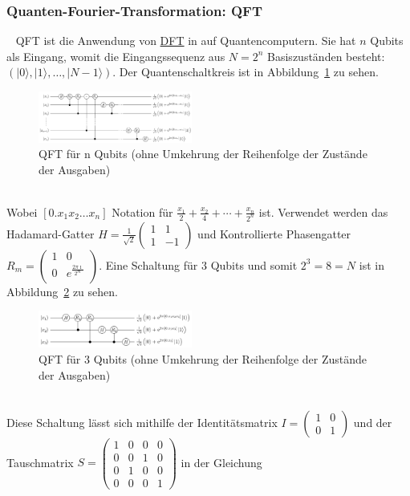 \subsubsection{\textbf{Quanten-Fourier-Transformation: QFT}}\label{sec:QFT}~\newline
QFT ist die Anwendung von \hyperref[sec:DFT]{DFT} in auf Quantencomputern. Sie hat \(n\) Qubits als Eingang, womit die Eingangssequenz aus \(N = 2^n\) Basiszuständen besteht: \(\left(|0\rangle,|1\rangle,\dots,|N-1\rangle\right)\). Der Quantenschaltkreis ist in Abbildung~\ref{fig:QFT_n_Qubits} zu sehen.
\begin{figure}[hb]
	\centering
	\includegraphics[width=0.45\textwidth]{sections/felix/Q_fourier_nqubits.png}
	\caption{QFT für n Qubits (ohne Umkehrung der Reihenfolge der Zustände der Ausgaben) \cite{noauthor_q_fourier_nqubitspng_2018}}
	\label{fig:QFT_n_Qubits}
\end{figure}
\\Wobei \(\left[0.x_1 x_2 \dots x_n\right]\) Notation für \(\frac{x_1}{2}+\frac{x_2}{4}+\cdots+\frac{x_n}{2^n}\) ist.
Verwendet werden das Hadamard-Gatter \(H = \frac{1}{\sqrt{2}}\begin{pmatrix}
	1 &  1\\
	1 & -1
\end{pmatrix}\) und Kontrollierte Phasengatter \(R_m = \begin{pmatrix}
	1 & 0\\
	0 & e^{\frac{2\pi\imath}{2^m}}\\
\end{pmatrix}\).
Eine Schaltung für \(3\) Qubits und somit \(2^3 = 8 = N\) ist in Abbildung~\ref{fig:QFT_3_Qubits} zu sehen. \cite{noauthor_list_2024}\\
\begin{figure}[hb]
	\centering
	\includegraphics[width=0.45\textwidth]{sections/felix/Q_fourier_3qubits.png}
	\caption{QFT für 3 Qubits (ohne Umkehrung der Reihenfolge der Zustände der Ausgaben) \cite{noauthor_q_fourier_3qubitspng_2018}}
	\label{fig:QFT_3_Qubits}
\end{figure}
\\Diese Schaltung lässt sich mithilfe der Identitätsmatrix \(I = \begin{pmatrix}
	1 & 0 \\
	0 & 1 
\end{pmatrix}\) und der Tauschmatrix \(S = \begin{pmatrix}
	1 & 0 & 0 & 0\\
	0 & 0 & 1 & 0\\
	0 & 1 & 0 & 0\\
	0 & 0 & 0 & 1
\end{pmatrix}\) in der Gleichung
